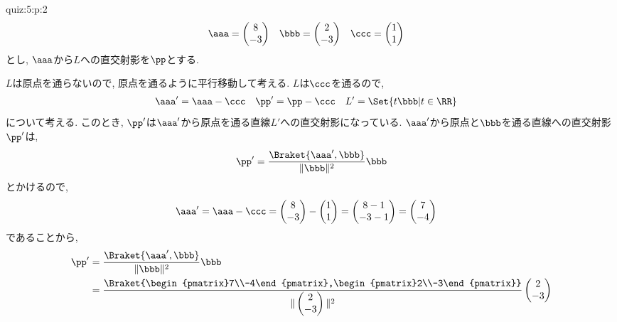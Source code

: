 \begin{answerof}{quiz:5:p:2}
  \begin{align*}
    \aaa&=\begin{pmatrix}8\\-3\end{pmatrix}&
    \bbb&=\begin{pmatrix}2\\-3\end{pmatrix}&
    \ccc&=\begin{pmatrix}1\\1\end{pmatrix}
  \end{align*}
  とし, $\aaa$から$L$への直交射影を$\pp$とする.
  
  $L$は原点を通らないので, 原点を通るように平行移動して考える.
  $L$は$\ccc$を通るので,
  \begin{align*}
    \aaa'&=\aaa-\ccc&
    \pp'&=\pp-\ccc&
    L'&=\Set{t\bbb|t\in\RR}
  \end{align*}
  について考える.
  このとき, $\pp'$は$\aaa'$から原点を通る直線$L'$への直交射影になっている.
  $\aaa'$から原点と$\bbb$を通る直線への直交射影$\pp'$は,
  \begin{align*}
    \pp'=\frac{\Braket{\aaa',\bbb}}{\|\bbb\|^2}\bbb
  \end{align*}
  とかけるので,
  \begin{align*}
    \aaa'&=\aaa-\ccc=\begin{pmatrix}8\\-3\end{pmatrix}-\begin{pmatrix}1\\1\end{pmatrix}
    =\begin{pmatrix}8-1\\-3-1\end{pmatrix}=\begin{pmatrix}7\\-4\end{pmatrix}
  \end{align*}
  であることから,
  \begin{align*}
  \pp'&=\frac{\Braket{\aaa',\bbb}}{\|\bbb\|^2}\bbb\\
  &=\frac{\Braket{\begin{pmatrix}7\\-4\end{pmatrix},\begin{pmatrix}2\\-3\end{pmatrix}}}{\|\begin{pmatrix}2\\-3\end{pmatrix}\|^2}\begin{pmatrix}2\\-3\end{pmatrix}\\

\end{align*}
\end{answerof}
